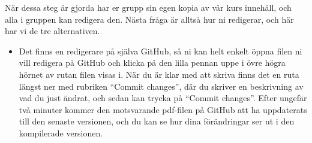 \documentclass{tufte-handout}
\begin{document}
När dessa steg är gjorda har er grupp sin egen kopia av vår kurs innehåll, och alla i gruppen kan redigera den. Nästa fråga är alltså hur ni redigerar, och här har vi de tre alternativen.
\begin{itemize}
	\item Det finns en redigerare på själva GitHub, så ni kan helt enkelt öppna filen ni vill redigera på GitHub och klicka på den lilla pennan uppe i övre högra hörnet av rutan filen visas i. När du är klar med att skriva finns det en ruta längst ner med rubriken ``Commit changes'', där du skriver en beskrivning av vad du just ändrat, och sedan kan trycka på ``Commit changes''. Efter ungefär två minuter kommer den motsvarande pdf-filen på GitHub att ha uppdaterats till den senaste versionen, och du kan se hur dina förändringar ser ut i den kompilerade versionen.


\end{itemize}
\end{document}
